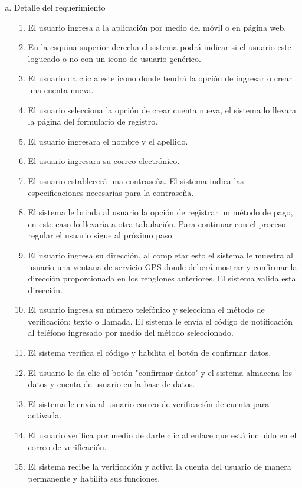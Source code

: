 \documentclass[conference]{IEEEtran}
\begin{document}
\begin{enumerate}
\begin{enumerate}[a)]
\item Detalle del requerimiento
	\begin{enumerate}[P{a}so 1.]
\item El usuario ingresa a la aplicación por medio del móvil o en página web.
\item En la esquina superior derecha el sistema podrá indicar si el usuario este logueado o no con un icono de usuario genérico.
\item El usuario da clic a este icono donde tendrá la opción de ingresar o crear una cuenta nueva.
\item El usuario selecciona la opción de crear cuenta nueva, el sistema lo llevara la página del formulario de registro.
\item El usuario ingresara el nombre y el apellido.
\item El usuario ingresara su correo electrónico.
\item El usuario establecerá una contraseña. El sistema indica las especificaciones necesarias para la contraseña.
\item El sistema le brinda al usuario la opción de registrar un método de pago, en este caso lo llevaría a otra tabulación. Para continuar con el proceso regular el usuario sigue al próximo paso.
\item El usuario ingresa su dirección, al completar esto el sistema le muestra al usuario una ventana de servicio GPS donde deberá mostrar y confirmar la dirección proporcionada en los renglones anteriores. El sistema valida esta dirección.
\item El usuario ingresa su número telefónico y selecciona el método de verificación: texto o llamada. El sistema le envía el código de notificación al teléfono ingresado por medio del método seleccionado.
\item El sistema verifica el código y habilita el botón de confirmar datos.
\item El usuario le da clic al botón "confirmar datos" y el sistema almacena los datos y cuenta de usuario en la base de datos.
\item El sistema le envía al usuario correo de verificación de cuenta para activarla.
\item El usuario verifica por medio de darle clic al enlace que está incluido en el correo de verificación.
\item El sistema recibe la verificación y activa la cuenta del usuario de manera permanente y habilita sus funciones.
	\end{enumerate}
	

\end{enumerate}
\end{enumerate}
\end{document}
